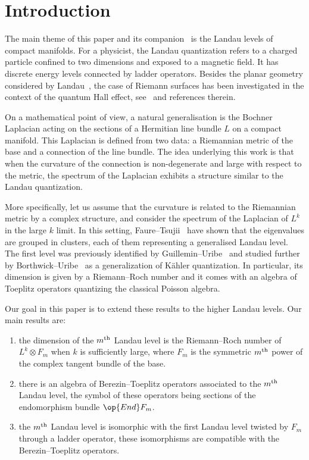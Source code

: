 \section{Introduction}

The main theme of this paper and its companion~\cite{oim_copain} is the Landau levels of compact manifolds. For a physicist, the Landau quantization refers to a charged particle confined to two dimensions and exposed to a magnetic field. It has discrete energy levels connected by ladder operators. Besides the planar geometry considered by Landau~\cite{La30}, the case of Riemann surfaces has been investigated in the context of the quantum Hall effect, see~\cite{IeLi94} and references therein.

On a mathematical point of view, a natural generalisation is the Bochner Laplacian acting on the sections of a Hermitian line bundle $L$ on a compact manifold. This Laplacian is defined from two data: a Riemannian metric of the base and a connection of the line bundle. The idea underlying this work is that when the curvature of the connection is non-degenerate and large with respect to the metric, the spectrum of the Laplacian exhibits a structure similar to the Landau quantization.

More specifically, let us assume that the curvature is related to the Riemannian metric by a complex structure, and consider the spectrum of the Laplacian of $L^{k}$ in the large $k$ limit. In this setting, Faure--Tsujii~\cite{FaTs15} have shown that the eigenvalues are grouped in clusters, each of them representing a generalised Landau level. The first level was previously identified by Guillemin--Uribe~\cite{GuUr88} and studied further by Borthwick--Uribe~\cite{BoUr96} as a generalization of K\"ahler quantization. In particular, its dimension is given by a Riemann--Roch number and it comes with an algebra of Toeplitz operators quantizing the classical Poisson algebra.

Our goal in this paper is to extend these results to the higher Landau levels. Our main results are:
\begin{enumerate}
\item the dimension of the $m^{\rm th}$ Landau level is the Riemann--Roch number of $L^k \otimes F_m$ when $k$ is sufficiently large, where $F_m$ is the symmetric $m^{\rm th}$ power of the complex tangent bundle of the base.
\item there is an algebra of Berezin--Toeplitz operators associated to the $m^{\rm th}$ Landau level, the symbol of these operators being sections of the endomorphism bundle $\op{End} F_m$.
\item the $m^{\rm th}$ Landau level is isomorphic with the first Landau level twisted by $F_m$ through a ladder operator, these isomorphisms are compatible with the Berezin--Toeplitz operators.
\end{enumerate}

